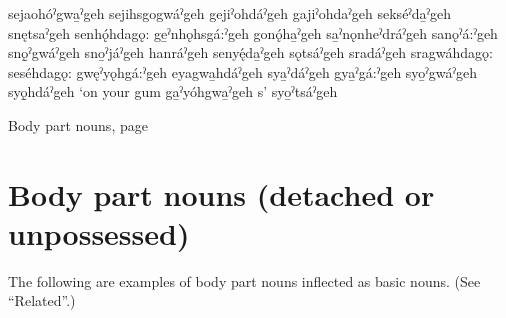 \begin{multicols}{2}
 sejaohóˀgwa̱ˀgeh 
 sejihsgogwáˀgeh 
 gejiˀohdáˀgeh 
 gajiˀohdaˀgeh 
 sekséˀda̱ˀgeh 
 snętsaˀgeh 
 senhǫ́hdagǫ: 
 ge̱ˀnhǫhsgá:ˀgeh 
 gonǫ́ha̱ˀgeh 
 sa̱ˀnǫnheˀdráˀgeh 
 sanǫˀá:ˀgeh 
 snǫ̱ˀgwáˀgeh 
 sno̱ˀjáˀgeh 
 hanráˀgeh 
 senyę́da̱ˀgeh 
 sǫtsáˀgeh 
 sradáˀgeh 
 sragwáhdagǫ: 
 seséhdagǫ: 
 gwęˀyǫhgá:ˀgeh 
 eyagwa̱hdáˀgeh 
 sya̱ˀdáˀgeh 
 gya̱ˀgá:ˀgeh 
 syo̱ˀgwáˀgeh 
 syǫ̱hdáˀgeh ‘on your gum
 ga̱ˀyóhgwa̱ˀgeh s’
 syo̱ˀtsáˀgeh 

\end{multicols}

\begin{CayugaRelated}
\item Body part nouns, page \pageref{ch:Body part nouns}
\end{CayugaRelated}

\section{Body part nouns (detached or unpossessed)} \label{ch:(detached or unpossessed)}
The following are examples of body part nouns inflected as basic nouns. (See “Related”.)

